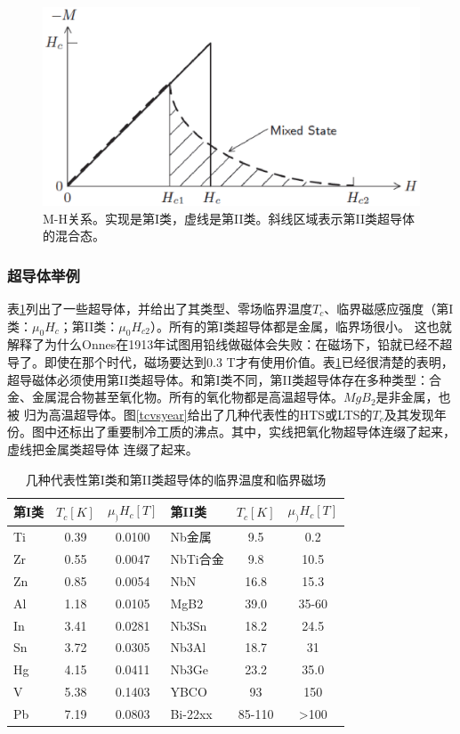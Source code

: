 \begin{figure}
  \centering
 \includegraphics[scale=0.6]{chpt1/figs/fig1.3.eps}
  \caption{
M-H关系。实现是第I类，虚线是第II类。斜线区域表示第II类超导体的混合态。
}\label{mhcurve}
\end{figure}

\subsubsection{超导体举例}
表\ref{criticalparameters}列出了一些超导体，并给出了其类型、零场临界温度$T_c$、临界磁感应强度（第I类：$\mu_0H_c$；第II类：$\mu_0H_{c2}$）。所有的第I类超导体都是金属，临界场很小。
这也就解释了为什么Onnes在1913年试图用铅线做磁体会失败：在磁场下，铅就已经不超导了。即使在那个时代，磁场要达到0.3 T才有使用价值。表\ref{criticalparameters}已经很清楚的表明，
超导磁体必须使用第II类超导体。和第I类不同，第II类超导体存在多种类型：合金、金属混合物甚至氧化物。所有的氧化物都是高温超导体。$MgB_2$是非金属，也被
归为高温超导体。图\ref{tcvsyear}给出了几种代表性的HTS或LTS的$T_c$及其发现年份。图中还标出了重要制冷工质的沸点。其中，实线把氧化物超导体连缀了起来，虚线把金属类超导体
连缀了起来。
\begin{table}[htbp]\small
  \centering
  \caption{几种代表性第I类和第II类超导体的临界温度和临界磁场} \label{criticalparameters}
  \begin{tabular}{|l|c|c||l|c|c|}
    \hline
    第I类 & $T_c[K]$ & $\mu_)H_c[T]$ & 第II类 & $T_c[K]$ & $\mu_)H_c[T]$ \\ \hline \hline
    Ti & 0.39 & 0.0100 & Nb金属 & 9.5 & 0.2 \\ \hline
    Zr & 0.55 & 0.0047 & NbTi合金 & 9.8 & 10.5 \\ \hline
    Zn & 0.85 & 0.0054 &NbN & 16.8 & 15.3 \\ \hline
    Al & 1.18 & 0.0105&MgB2 & 39.0 & 35-60\\ \hline
    In & 3.41 & 0.0281 & Nb3Sn & 18.2 & 24.5  \\ \hline
    Sn & 3.72 & 0.0305  & Nb3Al & 18.7 & 31\\ \hline
    Hg & 4.15 & 0.0411  & Nb3Ge & 23.2 & 35.0\\ \hline
    V & 5.38 & 0.1403& YBCO & 93 & 150\\ \hline
    Pb & 7.19 & 0.0803 & Bi-22xx & 85-110 & >100 \\
    \hline
  \end{tabular}
\end{table}

